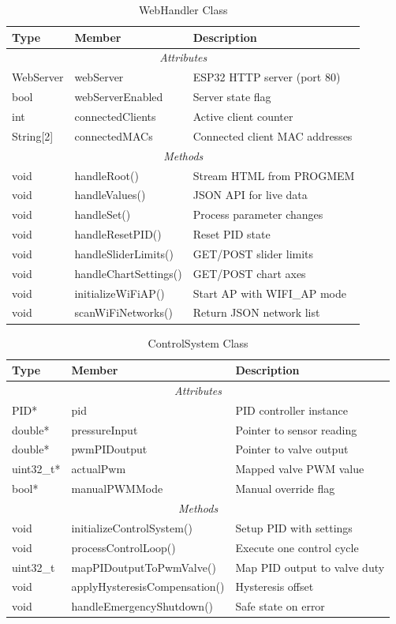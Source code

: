 \begin{table}[H]
\centering
\caption{WebHandler Class}
\label{tab:web-handler}
\begin{tabular}{|l|l|p{6cm}|}
\hline
\textbf{Type} & \textbf{Member} & \textbf{Description} \\
\hline
\multicolumn{3}{|c|}{\textit{Attributes}} \\
\hline
WebServer & webServer & ESP32 HTTP server (port 80) \\
bool & webServerEnabled & Server state flag \\
int & connectedClients & Active client counter \\
String[2] & connectedMACs & Connected client MAC addresses \\
\hline
\multicolumn{3}{|c|}{\textit{Methods}} \\
\hline
void & handleRoot() & Stream HTML from PROGMEM \\
void & handleValues() & JSON API for live data \\
void & handleSet() & Process parameter changes \\
void & handleResetPID() & Reset PID state \\
void & handleSliderLimits() & GET/POST slider limits \\
void & handleChartSettings() & GET/POST chart axes \\
void & initializeWiFiAP() & Start AP with WIFI\_AP mode \\
void & scanWiFiNetworks() & Return JSON network list \\
\hline
\end{tabular}
\end{table}

\begin{table}[H]
\centering
\caption{ControlSystem Class}
\label{tab:control-system}
\begin{tabular}{|l|l|p{6cm}|}
\hline
\textbf{Type} & \textbf{Member} & \textbf{Description} \\
\hline
\multicolumn{3}{|c|}{\textit{Attributes}} \\
\hline
PID* & pid & PID controller instance \\
double* & pressureInput & Pointer to sensor reading \\
double* & pwmPIDoutput & Pointer to valve output \\
uint32\_t* & actualPwm & Mapped valve PWM value \\
bool* & manualPWMMode & Manual override flag \\
\hline
\multicolumn{3}{|c|}{\textit{Methods}} \\
\hline
void & initializeControlSystem() & Setup PID with settings \\
void & processControlLoop() & Execute one control cycle \\
uint32\_t & mapPIDoutputToPwmValve() & Map PID output to valve duty \\
void & applyHysteresisCompensation() & Hysteresis offset \\
void & handleEmergencyShutdown() & Safe state on error \\
\hline
\end{tabular}
\end{table}

